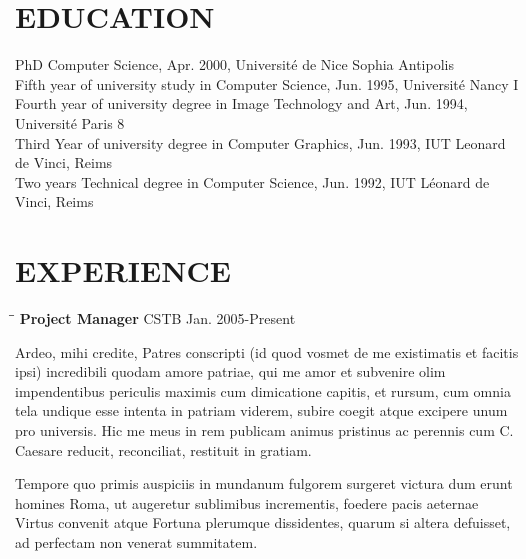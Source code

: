 \documentclass{res}
\begin{document}
 

                      
                                  
\begin{resume}

\section{EDUCATION}          
    PhD Computer Science, Apr. 2000, Universit\'e de Nice Sophia Antipolis\\
    Fifth year of university study in Computer Science, Jun. 1995, Universit\'e Nancy I\\
    Fourth year of university degree in Image Technology and Art, Jun. 1994, Universit\'e Paris 8\\
    Third Year of university degree in Computer Graphics, Jun. 1993, IUT Leonard de Vinci, Reims\\
    Two years Technical degree in Computer Science, Jun. 1992, IUT L\'eonard de Vinci, Reims
 
\section{EXPERIENCE}
   \vspace{-0.1in}  
   \begin{tabbing}
   \hspace{2.3in}\= \hspace{2.5in}\= \kill %
    {\bf Project Manager } \>CSTB     \>Jan. 2005-Present

   \end{tabbing}\vspace{-20pt}      %
   

Ardeo, mihi credite, Patres conscripti (id quod vosmet de me existimatis et facitis ipsi) incredibili quodam amore patriae, qui me amor et subvenire olim impendentibus periculis maximis cum dimicatione capitis, et rursum, cum omnia tela undique esse intenta in patriam viderem, subire coegit atque excipere unum pro universis. Hic me meus in rem publicam animus pristinus ac perennis cum C. Caesare reducit, reconciliat, restituit in gratiam.

Tempore quo primis auspiciis in mundanum fulgorem surgeret victura dum erunt homines Roma, ut augeretur sublimibus incrementis, foedere pacis aeternae Virtus convenit atque Fortuna plerumque dissidentes, quarum si altera defuisset, ad perfectam non venerat summitatem.


\end{resume}
\end{document}
